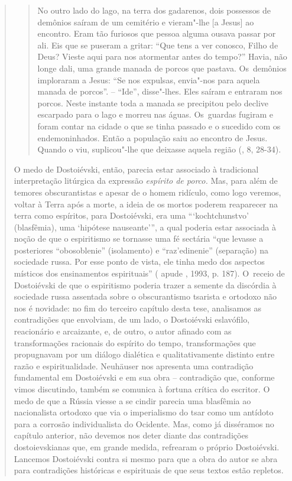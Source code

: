 {\begin{quote}
\begin{quote}
No outro lado do lago, na terra dos gadarenos, dois possessos de
demônios saíram de um cemitério e vieram"-lhe {[}a Jesus{]} ao encontro.
Eram tão furiosos que pessoa alguma ousava passar por ali. Eis que se
puseram a gritar: ``Que tens a ver conosco, Filho de Deus? Vieste aqui
para nos atormentar antes do tempo?'' Havia, não longe dali, uma grande
manada de porcos que pastava. Os~demônios imploraram a Jesus: ``Se nos
expulsas, envia"-nos para aquela manada de porcos''. -- ``Ide'',
disse"-lhes. Eles saíram e entraram nos porcos. Neste instante toda a
manada se precipitou pelo declive escarpado para o lago e morreu nas
águas. Os~guardas fugiram e foram contar na cidade o que se tinha
passado e o sucedido com os endemoninhados. Então a população saiu ao
encontro de Jesus. Quando o viu, suplicou"-lhe que deixasse aquela região
(, 8, 28-34).
\end{quote}

O medo de Dostoiévski, então, parecia estar associado à tradicional
interpretação litúrgica da expressão \emph{espírito de porco.} Mas, para
além de temores obscurantistas e apesar de o homem ridículo, como logo
veremos, voltar à Terra após a morte, a ideia de os mortos poderem
reaparecer na terra como espíritos, para Dostoiévski, era uma
```kochtchunstvo' (blasfêmia), uma `hipótese nauseante''', a qual
poderia estar associada à noção de que o espiritismo se tornasse uma fé
sectária ``que levasse a posteriores ``obosoblenie'' (isolamento) e
``raz'edinenie'' (separação) na sociedade russa. Por esse ponto de
vista, ele tinha medo dos aspectos místicos dos ensinamentos
espirituais'' ( apude , 1993, p. 187). O~receio de
Dostoiévski de que o espiritismo poderia trazer a semente da discórdia à
sociedade russa assentada sobre o obscurantismo tsarista e ortodoxo não
nos é novidade: no fim do terceiro capítulo desta tese, analisamos as
contradições que envolviam, de um lado, o Dostoiévski eslavófilo,
reacionário e arcaizante, e, de outro, o autor afinado com as
transformações racionais do espírito do tempo, transformações que
propugnavam por um diálogo dialética e qualitativamente distinto entre
razão e espiritualidade. Neuhäuser nos apresenta uma contradição
fundamental em Dostoiévski e em sua obra -- contradição que, conforme
vimos discutindo, também se comunica à fortuna crítica do escritor. O
medo de que a Rússia viesse a se cindir parecia uma blasfêmia ao
nacionalista ortodoxo que via o imperialismo do tsar como um antídoto
para a corrosão individualista do Ocidente. Mas, como já disséramos no
capítulo anterior, não devemos nos deter diante das contradições
dostoievskianas que, em grande medida, refrearam o próprio Dostoiévski.
Lancemos Dostoiévski contra si mesmo para que a obra do autor se abra
para contradições históricas e espirituais de que seus textos estão
repletos.


\end{quote}}
